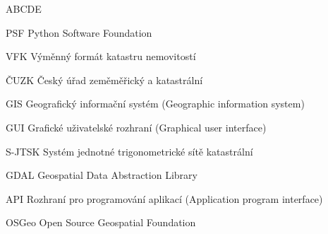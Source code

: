 
\begin{seznamzkratek}{ABCDE}

		  {PSF}
	      {Python Software Foundation}
	      
		  {VFK}
	      {Výměnný formát katastru nemovitostí}
	      
	      {ČUZK}
	      {Český úřad zeměměřický a katastrální}

	      {GIS}
	      {Geografický informační systém (Geographic information system)}
	         
	      {GUI}
	      {Grafické uživatelské rozhraní (Graphical user interface)}
	           
	      {S-JTSK}
	      {Systém jednotné trigonometrické sítě katastrální}      
	      
	      {GDAL}
	      {Geospatial Data Abstraction Library}
	      
	      {API}
	      {Rozhraní pro programování aplikací (Application program interface)}    
	      
	      {OSGeo}
	      {Open Source Geospatial Foundation}
	      
\end{seznamzkratek}